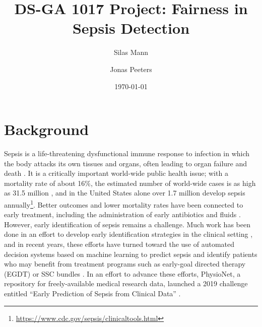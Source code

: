 \documentclass[10pt,letterpaper]{article}
\author{Silas Mann \and Jonas Peeters}
\title{DS-GA 1017 Project: Fairness in Sepsis Detection}
\date{\today}
\begin{document}
\maketitle
\vspace*{-1cm}



\section*{Background}


\par Sepsis is a life-threatening dysfunctional immune response to infection in which the body attacks its own tissues and organs, often leading to organ failure and death \cite{Singer2016}. It is a critically important world-wide public health issue; with a mortality rate of about 16\%, the estimated number of world-wide cases is as high as 31.5 million \cite{Fleischmann2016}, and in the United States alone over 1.7 million develop sepsis annually\footnote{\href{https://www.cdc.gov/sepsis/clinicaltools/index.html?CDC_AA_refVal=https\%3A\%2F\%2Fwww.cdc.gov\%2Fsepsis\%2Fdatareports\%2Findex.html}{https://www.cdc.gov/sepsis/clinicaltools.html}}. Better outcomes and lower mortality rates have been connected to early treatment, including the administration of early antibiotics and fluids \cite{Rhee2018}. However, early identification of sepsis remains a challenge. Much work has been done in an effort to develop early identification strategies in the clinical setting \cite{Kim2019}, and in recent years, these efforts have turned toward the use of automated decision systems based on machine learning to predict sepsis \cite{Fleuren2020} and identify patients who may benefit from treatment programs such as early-goal directed therapy (EGDT) or SSC bundles \cite{Kim2019}. In an effort to advance these efforts, PhysioNet, a repository for freely-available medical research data, launched a 2019 challenge entitled “Early Prediction of Sepsis from Clinical Data” \cite{Reyna2019}.
\end{document}
